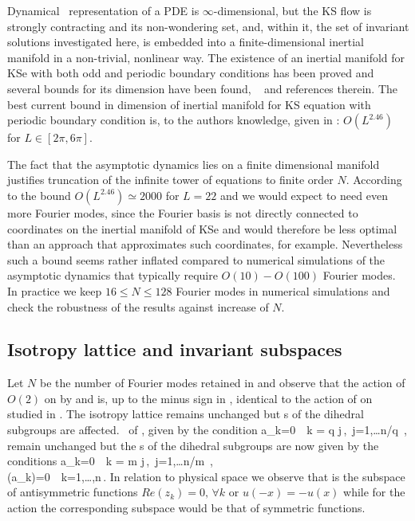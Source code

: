 Dynamical \statesp\ representation of a PDE is $\infty$-dimensional,
but the KS flow is strongly contracting and its non-wondering set,
and, within it, the set of invariant solutions investigated here, is
embedded into a finite-dimensional inertial manifold in
a non-trivial, nonlinear way. The existence of an inertial manifold for
KSe with both odd and periodic boundary conditions has been proved and
several bounds for its dimension have been found, \cf\  and references
therein. The best current bound in dimension of inertial manifold for KS
equation with periodic boundary condition is, to the authors knowledge,
given in : $O(L^{2.46})$ for $L\in[2\pi,6\pi]$.

The fact that the asymptotic dynamics lies on a finite
dimensional manifold justifies truncation of the infinite tower
of equations  to finite order $N$. According to
the bound $O(L^{2.46})\simeq2000$ for $L=22$ and we would expect to need even more
Fourier modes, since the Fourier basis is not directly
connected to coordinates on the inertial manifold of KSe and
would therefore be less optimal than an approach that
approximates such coordinates, for
example.
Nevertheless such a bound seems rather inflated compared to
numerical simulations of the asymptotic dynamics that typically
require $O(10)-O(100)$ Fourier modes. In practice we keep
$16\leq N \leq 128$ Fourier modes in numerical simulations and
check the robustness of the results against increase of $N$.

\subsection{Isotropy lattice and invariant subspaces}
\label{ksIso}

Let $N$ be the number of Fourier modes retained in 
and observe that the action of $O(2)$
on  by  and  is,
up to the minus sign in , identical
to the action  of  on  studied
in .
The isotropy lattice remains unchanged but \fixedsp s of the dihedral subgroups are affected.
\Fixedsp\ of , given by the condition
\beq
	a_k=0\ \ k = q j\,,\ j=1,\ldots\lfloor n/q \rfloor\,,
	\label{eq:O2CqFix}
\eeq
remain unchanged but the \fixedsp s of the dihedral subgroups  are now given by the conditions
\bea
	a_k=0\ \ k = m j\,,\ j=1,\ldots\lfloor n/m \rfloor\,, \\
	\Re(a_k)=0\ \ k=1,\ldots,n\,.
	\label{eq:O2ksDqFix}
\eea
In relation to physical space we observe that  is the subspace of antisymmetric functions $Re(z_k)=0,\, \forall k$ or $u(-x)=-u(x)$ while for the action  the corresponding
subspace would be that of symmetric functions.

